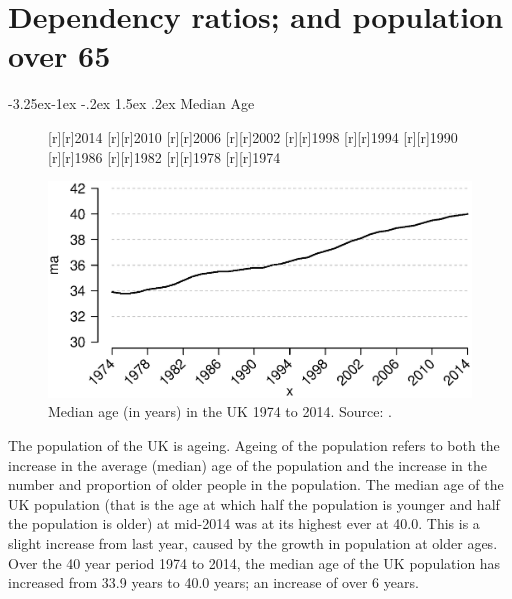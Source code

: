 \documentclass[11 pt, a4paper]{report}
\makeatletter
\renewcommand\subsection{\@startsection{subsection}{2}{\z@}%
                                     {-3.25ex\@plus -1ex \@minus -.2ex}%
                                     {1.5ex \@plus .2ex}%
    								{\large\scshape}}
\makeatother
\begin{document}
%



\chapter{Dependency ratios; and population over 65} %
\subsection{Median Age}

\begin{figure}[hbtp!]
[r][r]{\small{2014}}
[r][r]{\small{2010}}
[r][r]{\small{2006}}
[r][r]{\small{2002}}
[r][r]{\small{1998}}
[r][r]{\small{1994}}
[r][r]{\small{1990}}
[r][r]{\small{1986}}
[r][r]{\small{1982}}
[r][r]{\small{1978}}
[r][r]{\small{1974}}


\includegraphics[width=\textwidth]{../figures/Fig4.1.eps}
\caption{Median age (in years) in the UK 1974 to 2014. Source: \citet{ONS2015b}.}
\label{Fig:12}
\end{figure}

The population of the UK is ageing. Ageing of the population refers to both the increase in the average (median) age of the population and the increase in the number and proportion of older people in the population.
The median age of the UK population (that is the age at which half the population is younger and half the population is older) at mid-2014 was at its highest ever at 40.0. This is a slight increase from last year, caused by the growth in population at older ages. 
Over the 40 year period 1974 to 2014, the median age of the UK population has increased from 33.9 years to 40.0 years; an increase of over 6 years.
\end{document}
